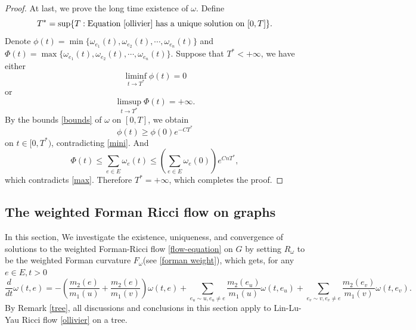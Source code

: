 \documentclass{article}
\begin{document}
\begin{proof}
At last, we prove the long time existence of $\omega$. Define
\[
T^* = \sup\{T : \text{Equation \eqref{ollivier} has a unique solution on } [0, T]\}.
\]
Denote \( \phi(t) = \min\{\omega_{e_1}(t), \omega_{e_2}(t), \cdots, \omega_{e_n}(t)\} \) and $\Phi(t) = \max\{\omega_{e_1}(t), \omega_{e_2}(t), \cdots, \omega_{e_n}(t)\}$. Suppose that \( T^* < +\infty \),  we have either 
\begin{equation}\label{mini}
    \liminf_{t \to T^*} \phi(t) = 0
\end{equation}
or
\begin{equation}\label{max}
    \limsup_{t \to T^*} \Phi(t) = +\infty. 
\end{equation}
By the bounds \eqref{bounds} of $\omega$ on $[0,T]$, we obtain 
\[ \phi(t) \geq \phi(0)e^{-CT^*} \] 
on \( t \in [0, T^*)\), contradicting \eqref{mini}. 
And
\[
\Phi(t) \leq \sum_{e \in E} \omega_e(t) \leq \left(\sum_{e \in E} \omega_e(0)\right)e^{CnT^*},
\]
which contradicts \eqref{max}. Therefore \( T^* = +\infty \), which completes the proof.
\end{proof}

\subsection{The weighted Forman Ricci flow on graphs}
In this section, We investigate the existence, uniqueness, and convergence of solutions to the weighted Forman-Ricci flow \eqref{flow-equation} on $G$ by setting $R_\omega$ to be the weighted Forman curvature $F_{\omega}$(see \eqref{forman weight}), which gets, for any $e\in E, t>0$
\begin{equation}\label{fm1}
  \frac{d}{dt}\omega(t,e)=-\left(\frac{m_2(e)}{m_1(u)}+\frac{m_2(e)}{m_1(v)}\right)\omega(t,e)+\sum_{e_u\sim u,e_u\neq e}\frac{m_2(e_u)}{m_1(u)}\omega(t,e_u)+\sum_{e_v\sim v,e_v\neq e}\frac{m_2(e_v)}{m_1(v)}\omega(t,e_v).  
\end{equation}
By Remark \ref{tree}, all discussions and conclusions in this section apply to Lin-Lu-Yau Ricci flow \eqref{ollivier} on a tree.
 
\end{document}
